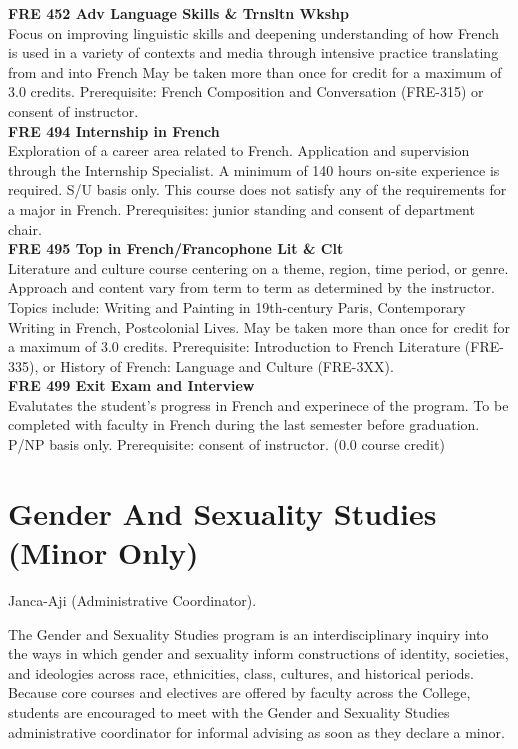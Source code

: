 \documentclass[
  letterpaper,
]{scrbook}
\begin{document}
\textbf{FRE 452 Adv Language Skills \& Trnsltn Wkshp}\\
Focus on improving linguistic skills and deepening understanding of how
French is used in a variety of contexts and media through intensive
practice translating from and into French May be taken more than once
for credit for a maximum of 3.0 credits. Prerequisite: French
Composition and Conversation (FRE-315) or consent of instructor.\\
\textbf{FRE 494 Internship in French}\\
Exploration of a career area related to French. Application and
supervision through the Internship Specialist. A minimum of 140 hours
on-site experience is required. S/U basis only. This course does not
satisfy any of the requirements for a major in French. Prerequisites:
junior standing and consent of department chair.\\
\textbf{FRE 495 Top in French/Francophone Lit \& Clt}\\
Literature and culture course centering on a theme, region, time period,
or genre. Approach and content vary from term to term as determined by
the instructor. Topics include: Writing and Painting in 19th-century
Paris, Contemporary Writing in French, Postcolonial Lives. May be taken
more than once for credit for a maximum of 3.0 credits. Prerequisite:
Introduction to French Literature (FRE- 335), or History of French:
Language and Culture (FRE-3XX).\\
\textbf{FRE 499 Exit Exam and Interview}\\
Evalutates the student's progress in French and experinece of the
program. To be completed with faculty in French during the last semester
before graduation. P/NP basis only. Prerequisite: consent of instructor.
(0.0 course credit)

\section{Gender And Sexuality Studies (Minor
Only)}\label{sec-gender-and-sexuality-studies}

Janca-Aji (Administrative Coordinator).

The Gender and Sexuality Studies program is an interdisciplinary inquiry
into the ways in which gender and sexuality inform constructions of
identity, societies, and ideologies across race, ethnicities, class,
cultures, and historical periods. Because core courses and electives are
offered by faculty across the College, students are encouraged to meet
with the Gender and Sexuality Studies administrative coordinator for
informal advising as soon as they declare a minor.
\end{document}
